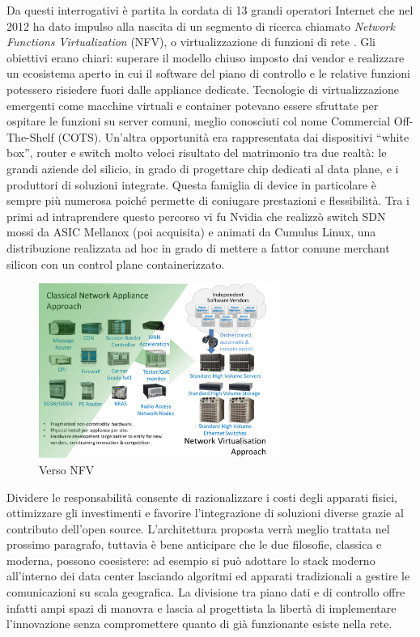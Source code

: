 Da questi interrogativi è partita la cordata di 13 grandi operatori Internet che nel 2012 ha dato impulso alla nascita di un segmento di ricerca chiamato \textit{Network Functions Virtualization} (NFV), o virtualizzazione di funzioni di rete \cite{nfvwhitepaper1}. Gli obiettivi erano chiari: superare il modello chiuso imposto dai vendor e realizzare un ecosistema aperto in cui il software del piano di controllo e le relative funzioni potessero risiedere fuori dalle appliance dedicate. Tecnologie di virtualizzazione emergenti come macchine virtuali e container potevano essere sfruttate per ospitare le funzioni su server comuni, meglio conosciuti col nome Commercial Off-The-Shelf (COTS). Un'altra opportunità era rappresentata dai dispositivi ``white box'', router e switch molto veloci risultato del matrimonio tra due realtà: le grandi aziende del silicio, in grado di progettare chip dedicati al data plane, e i produttori di soluzioni integrate. Questa famiglia di device in particolare è sempre più numerosa poiché permette di coniugare prestazioni e flessibilità. Tra i primi ad intraprendere questo percorso vi fu Nvidia che realizzò switch SDN mossi da ASIC Mellanox (poi acquisita) e animati da Cumulus Linux, una distribuzione realizzata ad hoc in grado di mettere a fattor comune merchant silicon con un control plane containerizzato.

\begin{figure}[htb]
    \includegraphics[width=0.7\textwidth]{graphics/trad-vs-nfv.png}
    \caption{Verso NFV}
    \label{fig:trad-vs-nfv}
\end{figure}

Dividere le responsabilità consente di razionalizzare i costi degli apparati fisici, ottimizzare gli investimenti e favorire l'integrazione di soluzioni diverse grazie al contributo dell'open source. L'architettura proposta verrà meglio trattata nel prossimo paragrafo, tuttavia è bene anticipare che le due filosofie, classica e moderna, possono coesistere: ad esempio si può adottare lo stack moderno all'interno dei data center lasciando algoritmi ed apparati tradizionali a gestire le comunicazioni su scala geografica. La divisione tra piano dati e di controllo offre infatti ampi spazi di manovra e lascia al progettista la libertà di implementare l'innovazione senza compromettere quanto di già funzionante esiste nella rete.

